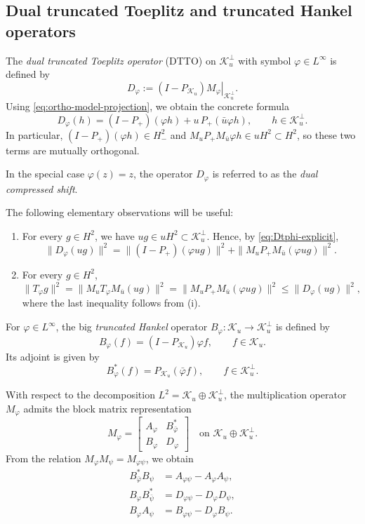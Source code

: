 \documentclass[12pt]{amsart}
\theoremstyle{definition}
\theoremstyle{remark}
\newcommand{\clk}{\mathcal{K}}
\newcommand{\vp}{\varphi}
\newcommand\restr[2]{\ensuremath{\left.#1\right|_{#2}}}
\numberwithin{equation}{section}
\begin{document}
\subsection{Dual truncated Toeplitz and truncated Hankel operators}

The \emph{dual truncated Toeplitz operator} (DTTO) on $\clk_u^\perp$ with symbol $\vp\in L^\infty$ is defined by
\[D_\vp := (I-P_{\clk_u})\restr{M_\vp}{\clk_u^\perp}.\]
Using \eqref{eq:ortho-model-projection}, we obtain the concrete formula
\begin{equation}\label{eq:Dtphi-explicit}
D_\vp(h) = (I-P_{+})(\vp h) + u\,P_{+}(\bar{u}\vp h),\qquad h\in \clk_u^\perp.
\end{equation}
In particular, $(I-P_{+})(\vp h)\in H^2_{-}$ and $M_u P_{+}M_{\bar{u}}\vp h\in uH^2\subset H^2$, so these two terms are mutually orthogonal.

In the special case $\vp(z)=z$, the operator $D_\vp$ is referred to as the \emph{dual compressed shift}.


The following elementary observations will be useful:

\begin{enumerate}
\item For every $g\in H^2$, we have $ug\in uH^2\subset\clk_u^\perp$.
Hence, by \eqref{eq:Dtphi-explicit},
\[
\|D_\vp(ug)\|^2 =\|(I-P_{+})(\vp ug)\|^2+\|M_uP_{+}M_{\bar{u}}(\vp ug)\|^2.
\]
	
\item For every $g\in H^2$,
\[
\|T_\vp g\|^2=\|M_uT_\vp M_{\bar{u}}(ug)\|^2
=\|M_uP_{+}M_{\bar{u}}(\vp ug)\|^2
\leq\|D_\vp(ug)\|^2,
\]
where the last inequality follows from \textup{(i)}.
\end{enumerate}


For $\vp\in L^\infty$, the big \emph{truncated Hankel} operator $B_\vp:\clk_u\to\clk_u^\perp$ is defined by
\begin{equation}\label{THO}
B_\vp(f) = (I-P_{\clk_u})\vp f, \qquad f\in \clk_u.
\end{equation}
Its adjoint is given by
\begin{equation}
B^*_\vp(f) = P_{\clk_u}(\bar{\vp} f),\qquad f\in \clk_u^\perp.
\end{equation}

With respect to the decomposition $L^2=\clk_u\oplus \clk_u^\perp$, the multiplication operator $M_\vp$ admits the block matrix representation
$$
M_\vp =
\begin{bmatrix}
	A_\vp & B^*_{\bar{\vp}} \\
	B_{\vp} & D_\vp
\end{bmatrix}
\quad\text{on } \clk_u \oplus \clk^\perp_u.
$$
From the relation $M_\vp M_\psi = M_{\vp\psi}$, we obtain
\begin{align}
B^*_{\bar{\vp}} B_\psi &= A_{\vp \psi} - A_\vp A_\psi, \\
B_\vp B^*_{\bar{\psi}} &= D_{\vp \psi} - D_\vp D_\psi, \label{DTTO-THO-relation}\\
B_\vp A_\psi &= B_{\vp \psi} - D_\vp B_\psi.
\end{align}
\end{document}
